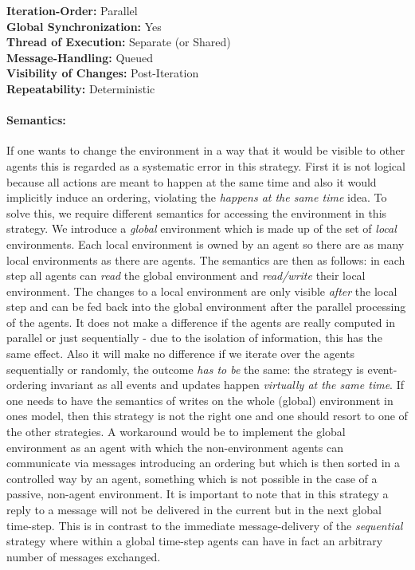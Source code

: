 \textbf{Iteration-Order:} Parallel \\
\textbf{Global Synchronization:} Yes \\
\textbf{Thread of Execution:} Separate (or Shared) \\
\textbf{Message-Handling:} Queued \\
\textbf{Visibility of Changes:}	Post-Iteration \\
\textbf{Repeatability:}	Deterministic

\paragraph{Semantics:} If one wants to change the environment in a way that it would be visible to other agents this is regarded as a systematic error in this strategy. First it is not logical because all actions are meant to happen at the same time and also it would implicitly induce an ordering, violating the \textit{happens at the same time} idea. To solve this, we require different semantics for accessing the environment in this strategy. We introduce a \textit{global} environment which is made up of the set of \textit{local} environments. Each local environment is owned by an agent so there are as many local environments as there are agents. The semantics are then as follows: in each step all agents can \textit{read} the global environment and \textit{read/write} their local environment. The changes to a local environment are only visible \textit{after} the local step and can be fed back into the global environment after the parallel processing of the agents. 
It does not make a difference if the agents are really computed in parallel or just sequentially - due to the isolation of information, this has the same effect. Also it will make no difference if we iterate over the agents sequentially or randomly, the outcome \textit{has to be} the same: the strategy is event-ordering invariant as all events and updates happen \textit{virtually at the same time}. If one needs to have the semantics of writes on the whole (global) environment in ones model, then this strategy is not the right one and one should resort to one of the other strategies. A workaround would be to implement the global environment as an agent with which the non-environment agents can communicate via messages introducing an ordering but which is then sorted in a controlled way by an agent, something which is not possible in the case of a passive, non-agent environment.
It is important to note that in this strategy a reply to a message will not be delivered in the current but in the next global time-step. This is in contrast to the immediate message-delivery of the \textit{sequential} strategy where within a global time-step agents can have in fact an arbitrary number of messages exchanged. \\

